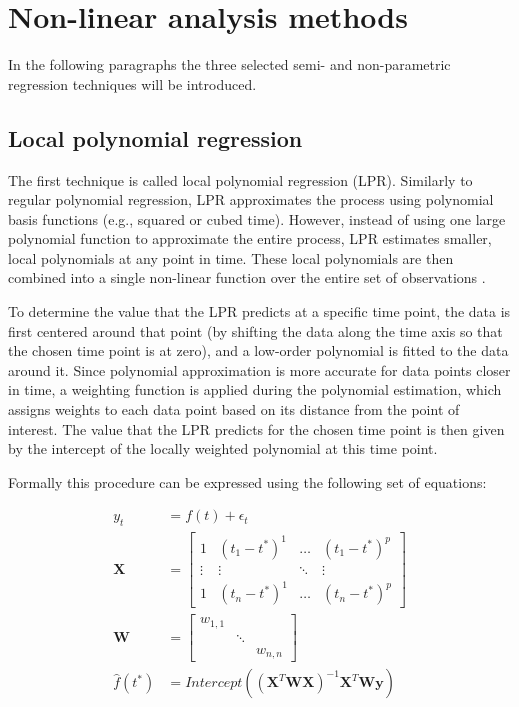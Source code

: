 \documentclass[man, floatsintext]{apa7}
\begin{document}
\section{Non-linear analysis methods}\label{method_introduction}

In the following paragraphs the three selected semi- and non-parametric
regression techniques will be introduced.

\subsection{Local polynomial regression}

The first technique is called local polynomial regression (LPR). Similarly to
regular polynomial regression, LPR approximates the process using polynomial
basis functions (e.g., squared or cubed time). However, instead of using one
large polynomial function to approximate the entire process, LPR estimates
smaller, local polynomials at any point in time. These local polynomials are
then combined into a single non-linear function over the entire set of
observations \parencite{fan_adaptive_1995, ruppert_multivariate_1994,
  fan_local_2018}.

To determine the value that the LPR predicts at a specific time point, the data
is first centered around that point (by shifting the data along the time axis
so that the chosen time point is at zero), and a low-order polynomial is fitted
to the data around it. Since polynomial approximation is more accurate for data
points closer in time, a weighting function is applied during the polynomial
estimation, which assigns weights to each data point based on its distance from
the point of interest. The value that the LPR predicts for the chosen time
point is then given by the intercept of the locally weighted polynomial at this
time point.

Formally this procedure can be expressed using the following set of equations:

\begin{equation} \label{eq:lpr_equations}
  \begin{aligned}
    y_t          & = f(t) + \epsilon_t                            \\
    \textbf{X}   & =
    \begin{bmatrix}
      1      & (t_1 - t^*)^1 & \dots  & (t_1 - t^*)^p \\
      \vdots & \vdots        & \ddots & \vdots        \\
      1      & (t_n - t^*)^1 & \dots  & (t_n - t^*)^p
    \end{bmatrix} \\
    \textbf{W}   & =
    \begin{bmatrix}
      w_{1, 1} &        &          \\
               & \ddots &          \\
               &        & w_{n, n}
    \end{bmatrix}                               \\
    \hat{f}(t^*) & =
    Intercept((\textbf{X}^T\textbf{WX})^{-1}\textbf{X}^T\textbf{Wy})
  \end{aligned}
\end{equation}
\end{document}
